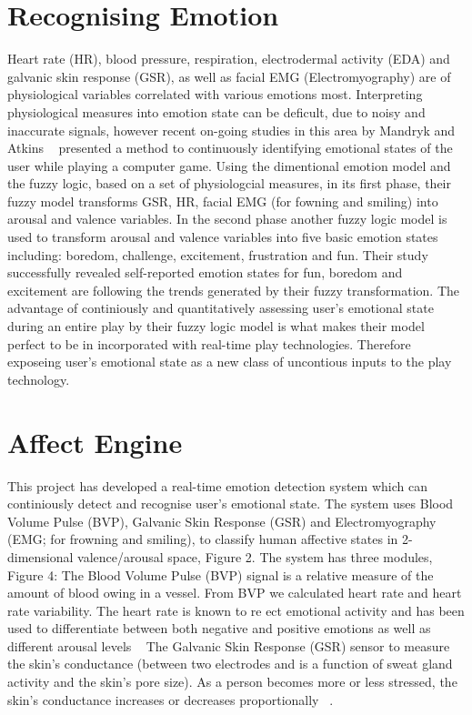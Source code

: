 
\section{Recognising Emotion}
Heart rate (HR), blood pressure, respiration, electrodermal
activity (EDA) and galvanic skin response (GSR), as well
as facial EMG (Electromyography) are of physiological variables
correlated with various emotions most. Interpreting
physiological measures into emotion state can be deficult,
due to noisy and inaccurate signals, however recent on-going
studies in this area by Mandryk and Atkins ~\cite{mandryk2007fuzzy} presented a
method to continuously identifying emotional states of the
user while playing a computer game. Using the dimentional
emotion model and the fuzzy logic, based on a set of physiologcial
measures, in its first phase, their fuzzy model transforms
GSR, HR, facial EMG (for fowning and smiling) into
arousal and valence variables. In the second phase another
fuzzy logic model is used to transform arousal and valence
variables into five basic emotion states including: boredom,
challenge, excitement, frustration and fun. Their study successfully
revealed self-reported emotion states for fun, boredom and excitement
are following the trends generated by
their fuzzy transformation. The advantage of continiously
and quantitatively assessing user's emotional state during an
entire play by their fuzzy logic model is what makes their
model perfect to be in incorporated with real-time play technologies.
Therefore exposeing user's emotional state as a
new class of uncontious inputs to the play technology.

\section{Affect Engine}
This project has developed a real-time emotion detection
system which can continiously detect and recognise user's
emotional state. The system uses Blood Volume Pulse (BVP),
Galvanic Skin Response (GSR) and Electromyography (EMG;
for frowning and smiling), to classify human affective states
in 2-dimensional valence/arousal space, Figure 2.
The system has three modules, Figure 4:
The Blood Volume Pulse (BVP) signal is a relative measure
of the amount of blood
owing in a vessel. From BVP we
calculated heart rate and heart rate variability. The heart
rate is known to re
ect emotional activity and has been used
to differentiate between both negative and positive emotions
as well as different arousal levels ~\cite{tt2013procomp}
The Galvanic Skin Response (GSR) sensor to measure the
skin's conductance (between two electrodes and is a function
of sweat gland activity and the skin's pore size). As a person
becomes more or less stressed, the skin's conductance
increases or decreases proportionally ~\cite{picard2003affective}.

